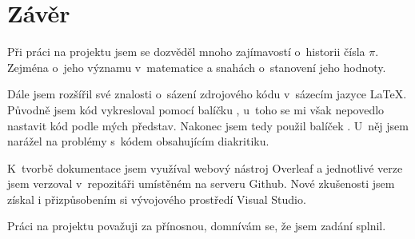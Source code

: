 \documentclass[11pt,a4paper]{report}
\begin{document}
	\chapter*{Závěr}
	\pagestyle{empty}
	Při práci na projektu jsem se dozvěděl mnoho zajímavostí o~historii čísla $\pi$. Zejména o~jeho významu v~matematice a snahách o~stanovení jeho hodnoty. 
	
	Dále jsem rozšířil své znalosti o~sázení zdrojového kódu v~sázecím jazyce \LaTeX. Původně jsem kód vykresloval pomocí balíčku , u~toho se mi však nepovedlo nastavit kód podle mých představ. Nakonec jsem tedy použil balíček . U~něj jsem narážel na problémy s~kódem obsahujícím diakritiku.
	
	K~tvorbě dokumentace jsem využíval webový nástroj Overleaf a jednotlivé verze jsem verzoval v~repozitáři umístěném na serveru Github. Nové zkušenosti jsem získal i přizpůsobením si vývojového prostředí Visual Studio.
	
	Práci na projektu považuji za přínosnou, domnívám se, že jsem zadání splnil.

	\nocite{dokumentace}
	\nocite{medium}
	\nocite{citace}
	\nocite{Historie_pi}
	\nocite{wiki:pi}
	\nocite{zvyrazneni_kodu}
	\nocite{clisting}
	\nocite{aproximace_pi}
	\printbibliography[title={Seznam použité literatury},heading={bibintoc}]
	
	
	\clearpage
	\listoffigures
	
	\clearpage
	\lstlistoflistings

	
	
	
\end{document}
